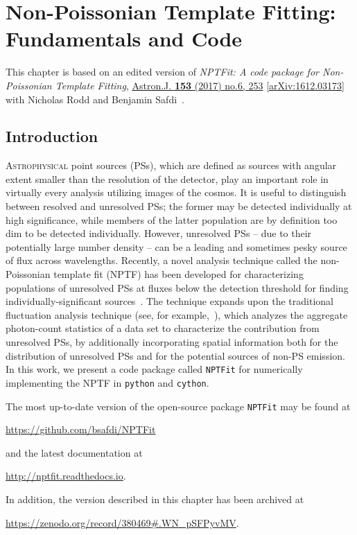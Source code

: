 \chapter{Non-Poissonian Template Fitting: Fundamentals and Code}
\label{ch:nptfit}

This chapter is based on an edited version of \emph{NPTFit: A code package for Non-Poissonian Template Fitting},  \href{http://iopscience.iop.org/article/10.3847/1538-3881/aa6d5f/meta}{Astron.J. \textbf{153} (2017) no.6, 253}  \href{https://arxiv.org/abs/1612.03173}{ [arXiv:1612.03173]} with Nicholas Rodd and Benjamin Safdi~\cite{Mishra-Sharma:2016gis}.

\section{Introduction}

\lettrine[lines=4]{A}{strophysical} point sources (PSs), which are defined as sources with angular extent smaller than the resolution of the detector, play an important role in virtually every analysis utilizing images of the cosmos.  It is useful to distinguish between resolved and unresolved PSs; the former may be detected individually at high significance, while members of the latter population are by definition too dim to be detected individually.  However, unresolved PSs -- due to their potentially large number density -- can be a leading and sometimes pesky source of flux across wavelengths.
  Recently, a novel analysis technique called the non-Poissonian template fit (NPTF) has been developed for characterizing populations of unresolved PSs at fluxes below the detection threshold for finding individually-significant sources~\cite{Lee:2014mza,Lee:2015fea}.  The technique expands upon the traditional fluctuation analysis technique (see, for example,~\cite{Miyaji:2001dp,Malyshev:2011zi}), which analyzes the aggregate photon-count statistics of a data set to characterize the contribution from unresolved PSs, by additionally incorporating spatial information both for the distribution of unresolved PSs and for the potential sources of non-PS emission.  In this work, we present a code package called \texttt{NPTFit} for numerically implementing the NPTF in \texttt{python} and \texttt{cython}.
  
The most up-to-date version of the open-source package \texttt{NPTFit} may be found at
\begin{center}
\url{https://github.com/bsafdi/NPTFit}
\end{center}
and the latest documentation at
\begin{center}
\url{http://nptfit.readthedocs.io}.
\end{center}
In addition, the version described in this chapter has been archived at
\begin{center}
\url{https://zenodo.org/record/380469#.WN_pSFPyvMV}.
\end{center}

